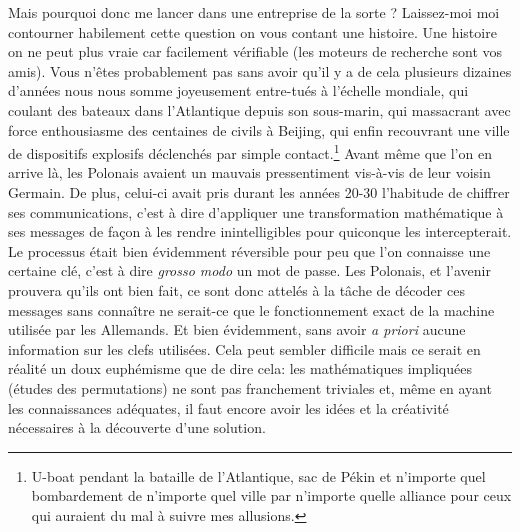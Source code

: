 Mais pourquoi donc me lancer dans une entreprise de la sorte ?
Laissez-moi moi contourner habilement cette question on vous contant
une histoire. Une histoire on ne peut plus vraie car facilement
vérifiable (les moteurs de recherche sont vos amis). Vous n'êtes
probablement pas sans avoir qu'il y a de cela plusieurs dizaines
d'années nous nous somme joyeusement entre-tués à l'échelle mondiale,
qui coulant des bateaux dans l'Atlantique depuis son sous-marin, qui
massacrant avec force enthousiasme des centaines de civils à Beijing,
qui enfin recouvrant une ville de dispositifs explosifs déclenchés par
simple contact.\footnote{U-boat pendant la bataille de l'Atlantique,
sac de Pékin et n'importe quel bombardement de n'importe quel ville
par n'importe quelle alliance pour ceux qui auraient du mal à suivre
mes allusions.} Avant même que l'on en arrive là, les Polonais avaient
un mauvais pressentiment vis-à-vis de leur voisin Germain. De plus,
celui-ci avait pris durant les années 20-30 l'habitude de chiffrer ses
communications, c'est à dire d'appliquer une transformation
mathématique à ses messages de façon à les rendre inintelligibles pour
quiconque les intercepterait. Le processus était bien évidemment
réversible pour peu que l'on connaisse une certaine clé, c'est à dire
\emph{grosso modo} un mot de passe. Les Polonais, et l'avenir prouvera
qu'ils ont bien fait, ce sont donc attelés à la tâche de décoder ces
messages sans connaître ne serait-ce que le fonctionnement exact de la
machine utilisée par les Allemands. Et bien évidemment, sans avoir
\emph{a priori} aucune information sur les clefs utilisées. Cela peut
sembler difficile mais ce serait en réalité un doux euphémisme que de
dire cela: les mathématiques impliquées (études des permutations) ne
sont pas franchement triviales et, même en ayant les connaissances
adéquates, il faut encore avoir les idées et la créativité nécessaires
à la découverte d'une solution.

